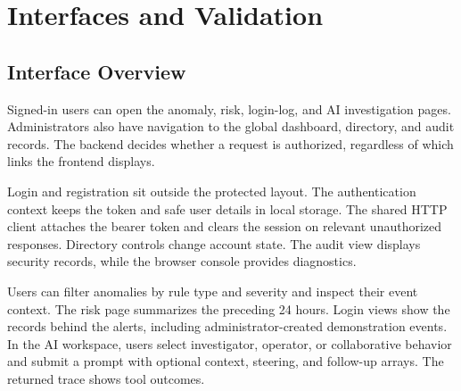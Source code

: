 \chapter{Interfaces and Validation}
\section{Interface Overview}
Signed-in users can open the anomaly, risk, login-log, and AI investigation pages. Administrators also have navigation to the global dashboard, directory, and audit records. The backend decides whether a request is authorized, regardless of which links the frontend displays.

Login and registration sit outside the protected layout. The authentication context keeps the token and safe user details in local storage. The shared HTTP client attaches the bearer token and clears the session on relevant unauthorized responses. Directory controls change account state. The audit view displays security records, while the browser console provides diagnostics.

Users can filter anomalies by rule type and severity and inspect their event context. The risk page summarizes the preceding 24 hours. Login views show the records behind the alerts, including administrator-created demonstration events. In the AI workspace, users select investigator, operator, or collaborative behavior and submit a prompt with optional context, steering, and follow-up arrays. The returned trace shows tool outcomes.



